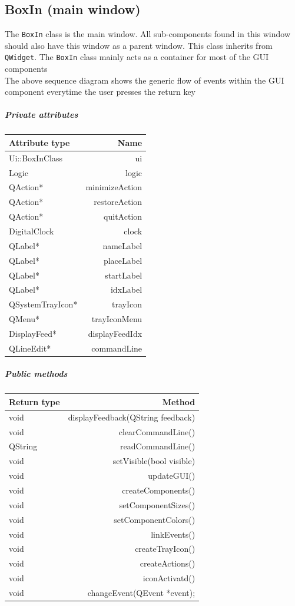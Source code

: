 \documentclass[12pt]{extarticle}
\begin{document}
\subsection{BoxIn (main window)}
The \texttt{BoxIn} class is the main window. All sub-components found in this window should also have this window as a parent window. This class inherits from \texttt{QWidget}. The \texttt{BoxIn} class mainly acts as a container for most of the GUI components\\
The above sequence diagram shows the generic flow of events within the GUI component everytime the user presses the return key\\
\subparagraph{Private attributes}
\begin{tabular}{l r}
Attribute type & Name\\
\hline
Ui::BoxInClass & ui\\
Logic & logic\\
QAction* & minimizeAction\\
QAction* & restoreAction\\
QAction* & quitAction\\
DigitalClock & clock\\
QLabel* & nameLabel\\
QLabel* & placeLabel\\
QLabel* & startLabel\\
QLabel* & idxLabel\\
QSystemTrayIcon* & trayIcon\\
QMenu* & trayIconMenu\\
DisplayFeed* & displayFeedIdx\\
QLineEdit* & commandLine\\
\end{tabular}
\subparagraph{Public methods}
\begin{tabular}{l r}
Return type & Method\\
\hline
void & displayFeedback(QString feedback)\\
void & clearCommandLine()\\
QString & readCommandLine()\\
void & setVisible(bool visible)\\
void & updateGUI()\\
void & createComponents()\\
void & setComponentSizes()\\
void & setComponentColors()\\
void & linkEvents()\\
void & createTrayIcon()\\
void & createActions()\\
void & iconActivatd()\\
void & changeEvent(QEvent *event);\\
\end{tabular}
\end{document}
